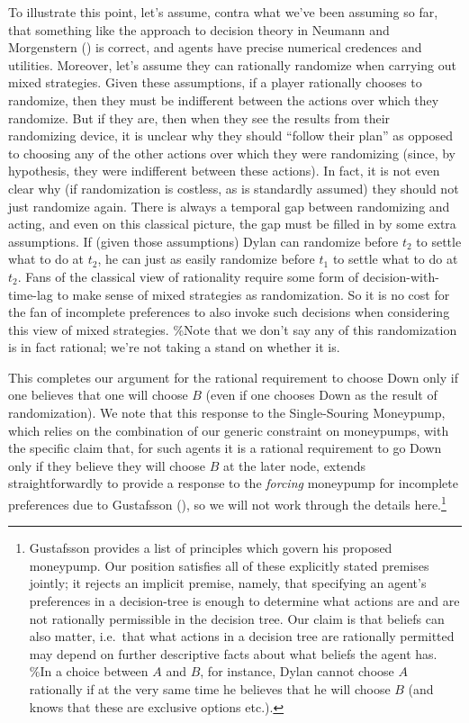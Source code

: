 \documentclass[
  11pt,
  letterpaper,
  DIV=11,
  numbers=noendperiod,
  twoside]{scrartcl}
\begin{document}
To illustrate this point, let's assume, contra what we've been assuming
so far, that something like the approach to decision theory in Neumann
and Morgenstern () is correct, and agents
have precise numerical credences and utilities. Moreover, let's assume
they can rationally randomize when carrying out mixed strategies. Given
these assumptions, if a player rationally chooses to randomize, then
they must be indifferent between the actions over which they randomize.
But if they are, then when they see the results from their randomizing
device, it is unclear why they should ``follow their plan'' as opposed
to choosing any of the other actions over which they were randomizing
(since, by hypothesis, they were indifferent between these actions). In
fact, it is not even clear why (if randomization is costless, as is
standardly assumed) they should not just randomize again. There is
always a temporal gap between randomizing and acting, and even on this
classical picture, the gap must be filled in by some extra assumptions.
If (given those assumptions) Dylan can randomize before \(t_2\) to
settle what to do at \(t_2\), he can just as easily randomize before
\(t_1\) to settle what to do at \(t_2\). Fans of the classical view of
rationality require some form of decision-with-time-lag to make sense of
mixed strategies as randomization. So it is no cost for the fan of
incomplete preferences to also invoke such decisions when considering
this view of mixed strategies. \%Note that we don't say any of this
randomization is in fact rational; we're not taking a stand on whether
it is.

This completes our argument for the rational requirement to choose Down
only if one believes that one will choose \(B\) (even if one chooses
Down as the result of randomization). We note that this response to the
Single-Souring Moneypump, which relies on the combination of our generic
constraint on moneypumps, with the specific claim that, for such agents
it is a rational requirement to go Down only if they believe they will
choose \(B\) at the later node, extends straightforwardly to provide a
response to the \emph{forcing} moneypump for incomplete preferences due
to Gustafsson (), so we will
not work through the details here.\footnote{Gustafsson provides a list
  of principles which govern his proposed moneypump. Our position
  satisfies all of these explicitly stated premises jointly; it rejects
  an implicit premise, namely, that specifying an agent's preferences in
  a decision-tree is enough to determine what actions are and are not
  rationally permissible in the decision tree. Our claim is that beliefs
  can also matter, i.e.~that what actions in a decision tree are
  rationally permitted may depend on further descriptive facts about
  what beliefs the agent has. \%In a choice between \(A\) and \(B\), for
  instance, Dylan cannot choose \(A\) rationally if at the very same
  time he believes that he will choose \(B\) (and knows that these are
  exclusive options etc.).}
\end{document}

